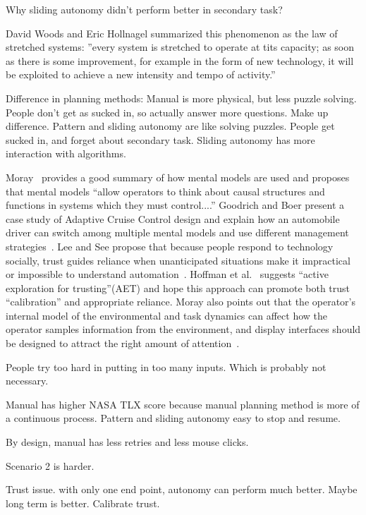 \documentclass[journal]{IEEEtran}
\begin{document}
Why sliding autonomy didn't perform better in secondary task?

David Woods and Eric Hollnagel summarized this phenomenon as the law of stretched systems: ''every system is stretched to operate at tits capacity; as soon as there is some improvement, for example in the form of new technology, it will be exploited to achieve a new intensity and tempo of activity.''  ~\cite{Woods2006Joint}

Difference in planning methods: 
Manual is more physical, but less puzzle solving. People don't get as sucked in, so actually answer more questions. Make up difference.
Pattern and sliding autonomy are like solving puzzles. People get sucked in, and forget about secondary task.
Sliding autonomy has more interaction with algorithms.


Moray~\cite{Moray1999Mental} provides a good summary of how mental models are used and proposes that mental models ``allow operators to think about causal structures and functions in systems which they must control....'' Goodrich and Boer present a case study of Adaptive Cruise Control design and explain how an automobile driver can switch among multiple mental models and use different management strategies~\cite{Goodrich2002Multiple, Goodrich2003Model}. Lee and See propose that because people respond to technology socially, trust guides reliance when unanticipated situations make it impractical or impossible to understand automation~\cite{Lee2004Trust}. Hoffman et al.\ \cite{Hoffman2013Trust} suggests ``active exploration for trusting''(AET) and hope this approach can promote both trust ``calibration'' and appropriate reliance. Moray also points out that the operator's internal model of the environmental and task dynamics can affect how the operator samples information from the environment, and display interfaces should be designed to attract the right amount of attention~\cite{Moray1990Designing}.

People try too hard in putting in too many inputs. Which is probably not necessary.

Manual has higher NASA TLX score because manual planning method is more of a continuous process. Pattern and sliding autonomy easy to stop and resume.

By design, manual has less retries and less mouse clicks.

Scenario 2 is harder.

Trust issue. with only one end point, autonomy can perform much better. Maybe long term is better. Calibrate trust.
\end{document}
